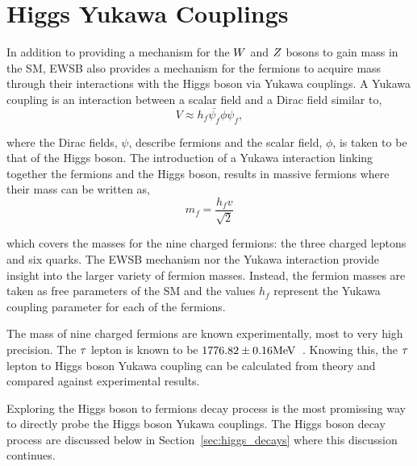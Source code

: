 \section{Higgs Yukawa Couplings}
In addition to providing a mechanism for the $W$ and $Z$ bosons to gain mass in the SM, EWSB also
provides a mechanism for the fermions to acquire mass through their interactions with the Higgs boson
via Yukawa couplings. A Yukawa coupling is an interaction between a scalar field and a Dirac field
similar to,
\begin{equation}
V \approx h_{f}\bar{\psi_{f}}\phi\psi_{f},
\end{equation}

where the Dirac fields, $\psi$, describe fermions and the scalar field, $\phi$, is taken to be that of the Higgs boson. 
The introduction of a Yukawa interaction linking together the fermions and the Higgs boson,
results in massive fermions where their mass can be written as,
\begin{equation}
m_{f} = \frac{h_{f} v}{\sqrt{2}}
\label{eqn:yukawa_c}
\end{equation}

which covers the masses for the nine charged fermions: the three charged leptons and six quarks.
The EWSB mechanism nor the Yukawa interaction provide insight into the larger variety of fermion
masses. Instead, the fermion masses are taken as free parameters of the SM and the values
$h_{f}$ represent the Yukawa coupling parameter for each of the fermions.

The mass of nine charged fermions are known experimentally, most to very high precision.
The $\tau$ lepton is known to be $1776.82\pm0.16\mathrm{MeV}$~\cite{PDG}.
Knowing this, the $\tau$ lepton to Higgs boson Yukawa coupling can be calculated from theory
and compared against experimental results. 

Exploring the Higgs boson to fermions decay process is the most promissing way to directly probe
the Higgs boson Yukawa couplings. The Higgs boson decay process are discussed below in 
Section~\ref{sec:higgs_decays} where this discussion continues.




